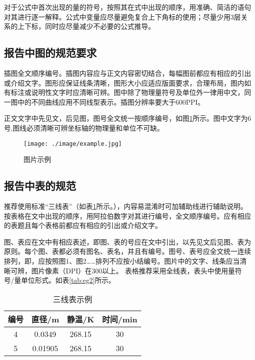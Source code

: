 \documentclass{thuemp}
\begin{document}
对于公式中首次出现的量的符号，按照其在式中出现的顺序，用准确、简洁的语句对其进行逐一解释。公式中变量应尽量避免复合上下角标的使用；尽量少用3层关系的上下标，同时应尽量减少不必要的公式推导。

\subsection{报告中图的规范要求}
插图全文顺序编号。插图内容应与正文内容密切结合，每幅图前都应有相应的引出或介绍文字。图形应保证线条清晰，图形大小应适应版面要求，合理布局，图内如有标注或说明性文字时应清晰可辨。图中除了物理量符号及单位外一律用中文，同一图中的不同曲线应用不同线型表示。插图分辨率要大于600PPI。

正文文字中先见文，后见图，图号全文统一按顺序编号，如图\ref{fig:eg}所示。图中文字为6号,图线必须清晰可辨坐标轴的物理量和单位不可缺。


\begin{figure}[H]
\centering
\texttt{[image: ./image/example.jpg]}
\caption{图片示例} \label{fig:eg}
\end{figure}


\subsection{报告中表的规范}
推荐使用标准“三线表”（如表\ref{tab:eg1}所示。），内容易混淆时可加辅助线进行辅助说明。按表格在文中出现的顺序，用阿拉伯数字对其进行编号，全文顺序编号。应有相应的表题且每个表格前都应有相应的引出或介绍文字。

图、表应在文中有相应表述，即图、表的号应在文中引出，以先见文后见图、表为原则。每个图、表都必须有图名、表名，并且有编号。图号、表号应全文统一连续排列，即，应按照图1、图2……排列不应按小结编号。图片中的文字、线条应当清晰可辨，图片像素（DPI）在300以上。
表格推荐采用全线表，表头中使用量符号/量单位形式。如表\ref{tab:eg2}所示。

\begin{table}[h]
\centering
\captionnamefont{\wuhao\bf\heiti}
\captiontitlefont{\wuhao\bf\heiti}
\caption{三线表示例} \label{tab:eg1}
\liuhao
\begin{tabular}{cccc}
\toprule
{编号} &  {直径}/\si{\metre} & {静温}/\si{\kelvin} & {时间}/min\\
\midrule 
4 & 0.0349 & 268.15 & 30\\
5 & 0.01905 & 268.15 & 30\\
\bottomrule
\end{tabular}
\end{table}
\end{document}
